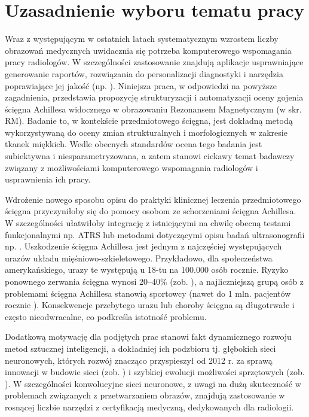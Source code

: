 {\let\clearpage\relax\chapter*{Uzasadnienie wyboru tematu pracy}}

Wraz z występującym w ostatnich latach systematycznym wzrostem liczby obrazowań medycznych uwidacznia się potrzeba komputerowego wspomagania pracy radiologów. W szczególności zastosowanie znajdują aplikacje usprawniające generowanie raportów, rozwiązania do personalizacji diagnostyki i narzędzia poprawiające jej jakość (np. \cite{LungChalenge, Tajbakhsh2016, Gulshan2016, Esteva2017, Erickson2018, Christiansen2018, Sarraf2016, Glasser2016, 2016arXiv160605718W}). Niniejsza praca, w odpowiedzi na powyższe zagadnienia, przedstawia propozycję strukturyzacji i automatyzacji oceny gojenia ścięgna Achillesa widocznego w obrazowaniu Rezonansem Magnetycznym (w skr. RM). Badanie to, w kontekście przedmiotowego ścięgna, jest dokładną metodą wykorzystywaną do oceny zmian strukturalnych i morfologicznych w zakresie tkanek miękkich. Wedle obecnych standardów ocena tego badania jest subiektywna i niesparametryzowana, a zatem stanowi ciekawy temat badawczy związany z możliwościami komputerowego wspomagania radiologów i usprawnienia ich pracy. 

Wdrożenie nowego sposobu opisu do praktyki klinicznej leczenia przedmiotowego ścięgna przyczyniłoby się do pomocy osobom ze schorzeniami ścięgna Achillesa. W szczególności ułatwiłoby integrację z istniejącymi na chwilę obecną testami funkcjonalnymi np. ATRS \cite{NilssonHelander2007} lub metodami dotyczącymi opisu badań ultrasonografii np. \cite{vanSchie2009}. Uszkodzenie ścięgna Achillesa jest jednym z najczęściej występujących urazów układu mięśniowo-szkieletowego. Przykładowo, dla społeczeństwa amerykańskiego, urazy te występują u 18-tu na 100.000 osób rocznie. Ryzyko ponownego zerwania ścięgna wynosi 20--40\% (zob. \cite{EpidemiologyUS}), a najliczniejszą grupą osób z problemami ścięgna Achillesa stanowią sportowcy (nawet do 1 mln. pacjentów rocznie \cite{EpidemiologySport}). Konsekwencje przebytego urazu lub choroby ścięgna są długotrwałe i często nieodwracalne, co podkreśla istotność problemu.

Dodatkową motywację dla podjętych prac stanowi fakt dynamicznego rozwoju metod sztucznej inteligencji, a dokładniej ich podzbioru tj. głębokich sieci neuronowych, których rozwój znacząco przyspieszył od 2012 r. za sprawą innowacji w budowie sieci (zob. \cite{Krizhevsky2012, ResNet, GoogleNet}) i szybkiej ewolucji możliwości sprzętowych (zob. \cite{DBLP:journals/corr/abs-1803-04014}). W szczególności konwolucyjne sieci neuronowe, z uwagi na dużą skuteczność w problemach związanych z przetwarzaniem obrazów, znajdują zastosowanie w rosnącej liczbie narzędzi z certyfikacją medyczną, dedykowanych dla radiologii.

